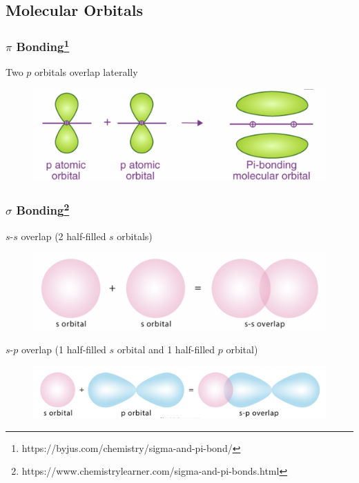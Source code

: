 \documentclass[a4paper, 12pt]{article}
\begin{document}
\subsection*{Molecular Orbitals}

\subsubsection*{$\pi$ Bonding\footnote{https://byjus.com/chemistry/sigma-and-pi-bond/}}

\begin{center}
    Two $p$ orbitals overlap laterally 
\end{center}

\begin{figure}[htbp]
    \centering
    \includegraphics[width=0.5\linewidth]{pibond.png}
    \label{fig:ahhsfhafhshahahdfhoasdf}
\end{figure}

\subsubsection*{$\sigma$ Bonding\footnote{https://www.chemistrylearner.com/sigma-and-pi-bonds.html}}

\begin{center}
    $s$-$s$ overlap (2 half-filled $s$ orbitals)
\end{center}

\begin{figure}[ht]
    \centering
    \includegraphics[width=0.45\linewidth]{ssoverlap.png}
    \label{fig:aaaaaaaaaaaaaaaaa}
\end{figure}

\begin{center}
    $s$-$p$ overlap (1 half-filled $s$ orbital and 1 half-filled $p$ orbital)
\end{center}

\begin{figure}[ht]
    \centering
    \includegraphics[width=0.5\linewidth]{spoverlap.png}
    \label{fig:enter-label}
\end{figure}
\end{document}
